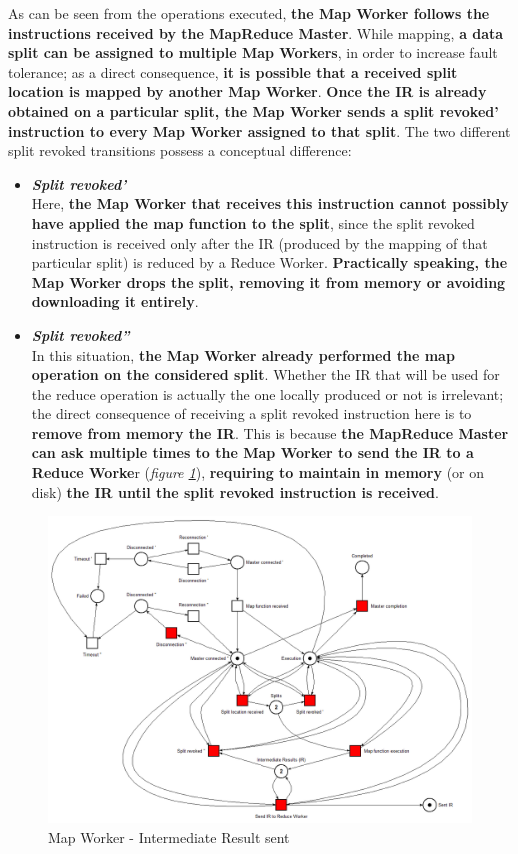 As can be seen from the operations executed, \textbf{the Map Worker follows the instructions received by the MapReduce Master}. While mapping, \textbf{a data split can be assigned to multiple Map Workers}, in order to increase fault tolerance; as a direct consequence, \textbf{it is possible that a received split location is mapped by another Map Worker}. \textbf{Once the IR is already obtained on a particular split, the Map Worker sends a split revoked' instruction to every Map Worker assigned to that split}. The two different split revoked transitions possess a conceptual difference:
\begin{itemize}
    \item \textit{\textbf{Split revoked'}}\\
    Here, \textbf{the Map Worker that receives this instruction cannot possibly have applied the map function to the split}, since the split revoked instruction is received only after the IR (produced by the mapping of that particular split) is reduced by a Reduce Worker. \textbf{Practically speaking, the Map Worker drops the split, removing it from memory or avoiding downloading it entirely}.
    \item \textit{\textbf{Split revoked''}}\\
    In this situation, \textbf{the Map Worker already performed the map operation on the considered split}. Whether the IR that will be used for the reduce operation is actually the one locally produced or not is irrelevant; the direct consequence of receiving a split revoked instruction here is to \textbf{remove from memory the IR}. This is because \textbf{the MapReduce Master can ask multiple times to the Map Worker to send the IR to a Reduce Worke}r (\textit{figure \ref{fig:map_worker_petri_net_3}}), \textbf{requiring to maintain in memory} (or on disk) \textbf{the IR until the split revoked instruction is received}.
\end{itemize}

\vspace{2mm}

\begin{figure}[!ht]
    \centering
    \includegraphics[width=\linewidth]{document/chapters/chapter_5/images/map_worker_petri_net_3.png}
    \caption{Map Worker - Intermediate Result sent}
    \label{fig:map_worker_petri_net_3}
\end{figure}

